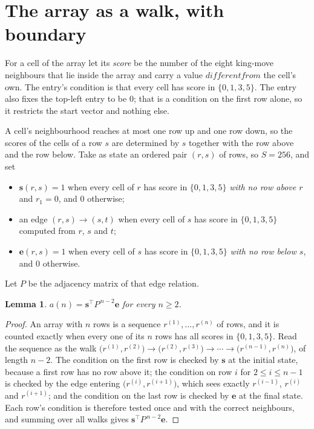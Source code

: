 \documentclass[11pt,a4paper]{article}
\theoremstyle{plain}
\newtheorem{lemma}[theorem]{Lemma}
\theoremstyle{definition}
\begin{document}
\section{The array as a walk, with boundary}

For a cell of the array let its \emph{score} be the number of the eight king-move neighbours that lie inside
the array and carry a value $different from$ the cell's own. The entry's condition is that every cell
has score in $\{0,1,3,5\}$. The entry also fixes the top-left entry to be $0$; that is a condition on the first row alone, so it restricts the start vector and nothing else.

A cell's neighbourhood reaches at most one row up and one row down, so the scores of the
cells of a row $s$ are determined by $s$ together with the row above and the row below.
Take as state an ordered pair $(r,s)$ of rows, so $S=256$, and set
\begin{itemize}
\item $\mathbf{s}(r,s)=1$ when every cell of $r$ has score in $\{0,1,3,5\}$ \emph{with no row
above $r$} and $r_1=0$, and $0$ otherwise;
\item an edge $(r,s)\to(s,t)$ when every cell of $s$ has score in $\{0,1,3,5\}$ computed from
$r$, $s$ and $t$;
\item $\mathbf{e}(r,s)=1$ when every cell of $s$ has score in $\{0,1,3,5\}$ \emph{with no row
below $s$}, and $0$ otherwise.
\end{itemize}
Let $P$ be the adjacency matrix of that edge relation.

\begin{lemma}\label{lem:walk}
$a(n)=\mathbf{s}^{\!\top}P^{\,n-2}\mathbf{e}$ for every $n\ge2$.
\end{lemma}

\begin{proof}
An array with $n$ rows is a sequence $r^{(1)},\dots,r^{(n)}$ of rows, and it is counted
exactly when every one of its $n$ rows has all scores in $\{0,1,3,5\}$. Read the sequence as the
walk $\bigl(r^{(1)},r^{(2)}\bigr)\to\bigl(r^{(2)},r^{(3)}\bigr)\to\cdots\to
\bigl(r^{(n-1)},r^{(n)}\bigr)$, of length $n-2$. The condition on the first row is
checked by $\mathbf{s}$ at the initial state, because a first row has no row above it; the
condition on row $i$ for $2\le i\le n-1$ is checked by the edge entering
$\bigl(r^{(i)},r^{(i+1)}\bigr)$, which sees exactly $r^{(i-1)}$, $r^{(i)}$ and
$r^{(i+1)}$; and the condition on the last row is checked by $\mathbf{e}$ at the final
state. Each row's condition is therefore tested once and with the correct neighbours, and
summing over all walks gives $\mathbf{s}^{\!\top}P^{\,n-2}\mathbf{e}$.
\end{proof}
\end{document}
